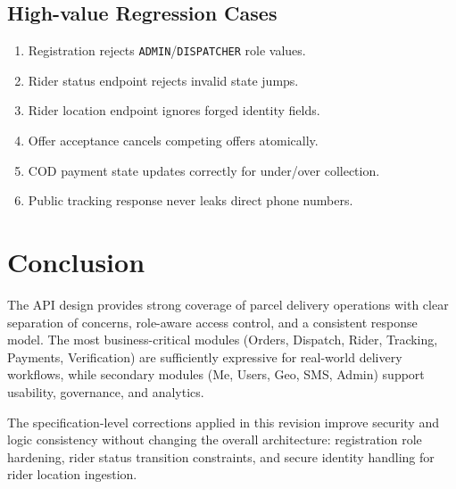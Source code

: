 \subsection{High-value Regression Cases}

\begin{enumerate}
		\item Registration rejects \texttt{ADMIN}/\texttt{DISPATCHER} role values.
		\item Rider status endpoint rejects invalid state jumps.
		\item Rider location endpoint ignores forged identity fields.
		\item Offer acceptance cancels competing offers atomically.
		\item COD payment state updates correctly for under/over collection.
		\item Public tracking response never leaks direct phone numbers.
\end{enumerate}

\section{Conclusion}

The API design provides strong coverage of parcel delivery operations with
clear separation of concerns, role-aware access control, and a consistent
response model. The most business-critical modules (Orders, Dispatch, Rider,
Tracking, Payments, Verification) are sufficiently expressive for real-world
delivery workflows, while secondary modules (Me, Users, Geo, SMS, Admin)
support usability, governance, and analytics.

The specification-level corrections applied in this revision improve security
and logic consistency without changing the overall architecture:
registration role hardening, rider status transition constraints, and secure
identity handling for rider location ingestion.

